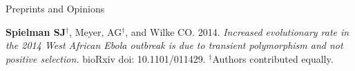 \documentclass{resume} %
\begin{document}


\vspace*{0.5cm}
\begin{rSection}{Preprints and Opinions}	
\vspace*{0.25cm}
	
\begin{etaremune}[leftmargin=1.5em]
	
\item \textbf{Spielman SJ}$^\dagger$, Meyer, AG$^\dagger$, and Wilke CO. 2014. \emph{Increased evolutionary rate in the 2014 West African Ebola outbreak is due to transient polymorphism and not positive selection.} bioRxiv doi: 10.1101/011429. $^\dagger$Authors contributed equally. \\
			
\end{etaremune}
	
	
\end{rSection}



\end{document}
